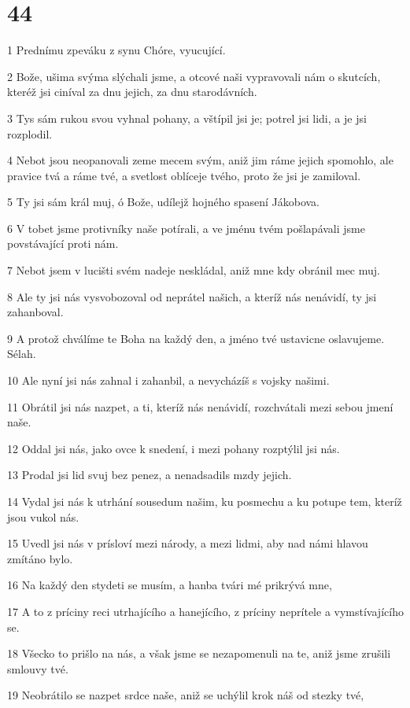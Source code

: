 \chapter{44}

\par 1 Prednímu zpeváku z synu Chóre, vyucující.
\par 2 Bože, ušima svýma slýchali jsme, a otcové naši vypravovali nám o skutcích, kteréž jsi ciníval za dnu jejich, za dnu starodávních.
\par 3 Tys sám rukou svou vyhnal pohany, a vštípil jsi je; potrel jsi lidi, a je jsi rozplodil.
\par 4 Nebot jsou neopanovali zeme mecem svým, aniž jim ráme jejich spomohlo, ale pravice tvá a ráme tvé, a svetlost oblíceje tvého, proto že jsi je zamiloval.
\par 5 Ty jsi sám král muj, ó Bože, udílejž hojného spasení Jákobova.
\par 6 V tobet jsme protivníky naše potírali, a ve jménu tvém pošlapávali jsme povstávající proti nám.
\par 7 Nebot jsem v lucišti svém nadeje neskládal, aniž mne kdy obránil mec muj.
\par 8 Ale ty jsi nás vysvobozoval od neprátel našich, a kteríž nás nenávidí, ty jsi zahanboval.
\par 9 A protož chválíme te Boha na každý den, a jméno tvé ustavicne oslavujeme. Sélah.
\par 10 Ale nyní jsi nás zahnal i zahanbil, a nevycházíš s vojsky našimi.
\par 11 Obrátil jsi nás nazpet, a ti, kteríž nás nenávidí, rozchvátali mezi sebou jmení naše.
\par 12 Oddal jsi nás, jako ovce k snedení, i mezi pohany rozptýlil jsi nás.
\par 13 Prodal jsi lid svuj bez penez, a nenadsadils mzdy jejich.
\par 14 Vydal jsi nás k utrhání sousedum našim, ku posmechu a ku potupe tem, kteríž jsou vukol nás.
\par 15 Uvedl jsi nás v prísloví mezi národy, a mezi lidmi, aby nad námi hlavou zmítáno bylo.
\par 16 Na každý den stydeti se musím, a hanba tvári mé prikrývá mne,
\par 17 A to z príciny reci utrhajícího a hanejícího, z príciny neprítele a vymstívajícího se.
\par 18 Všecko to prišlo na nás, a však jsme se nezapomenuli na te, aniž jsme zrušili smlouvy tvé.
\par 19 Neobrátilo se nazpet srdce naše, aniž se uchýlil krok náš od stezky tvé,
